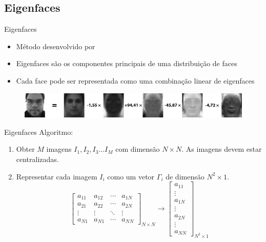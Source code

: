 \subsection{Eigenfaces}

\begin{frame}{Eigenfaces}
\begin{itemize}
    \item Método desenvolvido por 
    \item Eigenfaces são os componentes principais de uma distribuição de faces
    \item Cada face pode ser representada como uma combinação linear de eigenfaces
\end{itemize}
\begin{figure}[htbp]
    \centering
    \label{fig:eigenfaces_comblinear}
    \includegraphics[width=0.95\linewidth]{imagens/eign_lincomb.png}
\end{figure}
\end{frame}


\begin{frame}{Eigenfaces}
Algoritmo:
\begin{enumerate}
    \item Obter $M$ imagens $I_1, I_2, I_3 \ldots I_M$ com dimensão $N \times N$.
    As imagens devem estar centralizadas.
    \item Representar cada imagem $I_i$ como um vetor $\Gamma_i$ de dimensão $N^2 \times 1$.
    \begin{equation*} \label{eq:eign_gamma}
        \begin{bmatrix}
        a_{11} & a_{12} & \cdots & a_{1N}\\ 
        a_{21} & a_{22} & \cdots & a_{2N}\\ 
        \vdots & \vdots & \ddots & \vdots\\ 
        a_{N1} & a_{N1} & \cdots & a_{NN}
        \end{bmatrix}_{N \times N} \rightarrow \begin{bmatrix}
        a_{11}\\ 
        \vdots\\ 
        a_{1N}\\ 
        \vdots\\ 
        a_{2N}\\
        \vdots\\ 
        a_{NN}
        \end{bmatrix}_{N^2 \times 1}
    \end{equation*}
    \seti
\end{enumerate}
\end{frame}



